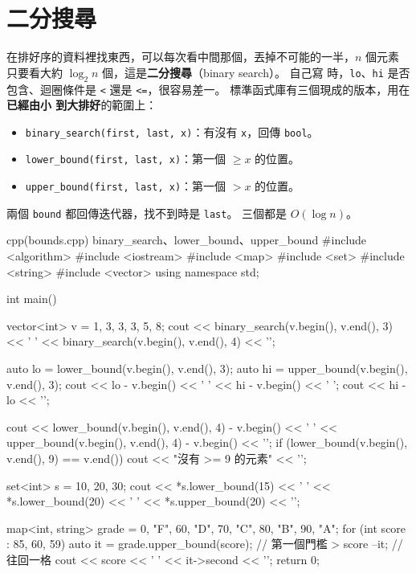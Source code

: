 \section{二分搜尋}
\label{sec:binary-search}

在排好序的資料裡找東西，可以每次看中間那個，丟掉不可能的一半，$n$ 個元素
只要看大約 $\log_2 n$ 個，這是\textbf{二分搜尋}（binary search）。 自己寫
時，\texttt{lo}、\texttt{hi} 是否包含、迴圈條件是 \texttt{<} 還是
\texttt{<=}，很容易差一。 標準函式庫有三個現成的版本，用在\textbf{已經由小
到大排好}的範圍上：

\begin{itemize}
\item \texttt{binary\_search(first, last, x)}：有沒有 \texttt{x}，回傳
\texttt{bool}。
\item \texttt{lower\_bound(first, last, x)}：第一個 $\ge x$ 的位置。
\item \texttt{upper\_bound(first, last, x)}：第一個 $> x$ 的位置。
\end{itemize}

兩個 \texttt{bound} 都回傳迭代器，找不到時是 \texttt{last}。 三個都是
$O(\log n)$。

\begin{example}[label=ex:bounds]{cpp}{(bounds.cpp) binary\_search、lower\_bound、upper\_bound}
#include <algorithm>
#include <iostream>
#include <map>
#include <set>
#include <string>
#include <vector>
using namespace std;

int main() {
    vector<int> v = {1, 3, 3, 3, 5, 8};
    cout << binary_search(v.begin(), v.end(), 3) << ' '
         << binary_search(v.begin(), v.end(), 4) << '\n';

    auto lo = lower_bound(v.begin(), v.end(), 3);
    auto hi = upper_bound(v.begin(), v.end(), 3);
    cout << lo - v.begin() << ' ' << hi - v.begin() << ' ';
    cout << hi - lo << '\n';

    cout << lower_bound(v.begin(), v.end(), 4) - v.begin() << ' '
         << upper_bound(v.begin(), v.end(), 4) - v.begin() << '\n';
    if (lower_bound(v.begin(), v.end(), 9) == v.end()) {
        cout << "沒有 >= 9 的元素" << '\n';
    }

    set<int> s = {10, 20, 30};
    cout << *s.lower_bound(15) << ' ' << *s.lower_bound(20) << ' '
         << *s.upper_bound(20) << '\n';

    map<int, string> grade = {
        {0, "F"}, {60, "D"}, {70, "C"}, {80, "B"}, {90, "A"}};
    for (int score : {85, 60, 59}) {
        auto it = grade.upper_bound(score);   // 第一個門檻 > score
        --it;                                 // 往回一格
        cout << score << ' ' << it->second << '\n';
    }
    return 0;
}
\end{example}

